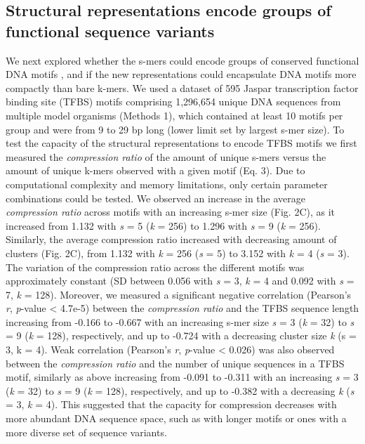 \documentclass[sigconf]{acmart}
\begin{document}
\subsection{Structural representations encode groups of functional sequence variants}
We next explored whether the s-mers could encode groups of conserved functional DNA motifs \cite{Levo2015-iu}, and if the new representations could encapsulate DNA motifs more compactly than bare k-mers. We used a dataset of 595 Jaspar transcription factor binding site (TFBS) motifs comprising 1,296,654 unique DNA sequences from multiple model organisms (Methods 1), which contained at least 10 motifs per group and were from 9 to 29 bp long (lower limit set by largest s-mer size). To test the capacity of the structural representations to encode TFBS motifs we first measured the \textit{compression ratio} of the amount of unique s-mers versus the amount of unique k-mers observed with a given motif (Eq. 3). Due to computational complexity and memory limitations, only certain parameter combinations could be tested. We observed an increase in the average \textit{compression ratio} across motifs with an increasing s-mer size (Fig. 2C), as it increased from 1.132 with \textit{s} = 5 (\textit{k} = 256) to 1.296 with \textit{s} = 9 (\textit{k} = 256). Similarly, the average compression ratio increased with decreasing amount of clusters (Fig. 2C), from 1.132 with \textit{k} = 256 (\textit{s} = 5) to 3.152 with \textit{k} = 4 (\textit{s} = 3). The variation of the compression ratio across the different motifs was approximately constant (SD between 0.056 with \textit{s} = 3, \textit{k} = 4 and 0.092 with \textit{s} = 7, \textit{k} = 128). Moreover, we measured a significant negative correlation (Pearson's \textit{r}, \textit{p}-value < 4.7e-5) between the \textit{compression ratio} and the TFBS sequence length increasing from -0.166 to -0.667 with an increasing s-mer size \textit{s} = 3 (\textit{k} = 32) to \textit{s} = 9 (\textit{k} = 128), respectively, and up to -0.724 with a decreasing cluster size \textit{k} (s = 3, k = 4). Weak correlation (Pearson's \textit{r}, \textit{p}-value < 0.026) was also observed between the \textit{compression ratio} and the number of unique sequences in a TFBS motif, similarly as above increasing from -0.091 to -0.311 with an increasing \textit{s} = 3 (\textit{k} = 32) to \textit{s} = 9 (\textit{k} = 128), respectively, and up to -0.382 with a decreasing \textit{k} (\textit{s} = 3, \textit{k} = 4). This suggested that the capacity for compression decreases with more abundant DNA sequence space, such as with longer motifs or ones with a more diverse set of sequence variants.
\end{document}

